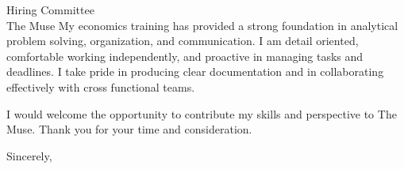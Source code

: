 \documentclass[11pt]{letter}
\begin{document}
\begin{letter}{Hiring Committee \\ The Muse}
My economics training has provided a strong foundation in analytical problem solving, organization, and communication. I am detail oriented, comfortable working independently, and proactive in managing tasks and deadlines. I take pride in producing clear documentation and in collaborating effectively with cross functional teams.

I would welcome the opportunity to contribute my skills and perspective to The Muse. Thank you for your time and consideration.

\closing{Sincerely,}

\end{letter}
\end{document}
